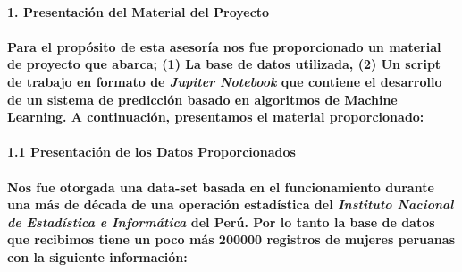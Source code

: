\documentclass[]{article}
\let\oldparagraph\paragraph
\renewcommand{\paragraph}[1]{\oldparagraph{#1}\mbox{}}
\begin{document}
\paragraph{\texorpdfstring{\textbf{1. Presentación del Material del
Proyecto}}{1. Presentación del Material del Proyecto}}\label{presentacion-del-material-del-proyecto}

\paragraph{\texorpdfstring{Para el propósito de esta asesoría nos fue
proporcionado un material de proyecto que abarca; (1) La base de datos
utilizada, (2) Un script de trabajo en formato de \emph{Jupiter
Notebook} que contiene el desarrollo de un sistema de predicción basado
en algoritmos de Machine Learning. A continuación, presentamos el
material
proporcionado:}{Para el propósito de esta asesoría nos fue proporcionado un material de proyecto que abarca; (1) La base de datos utilizada, (2) Un script de trabajo en formato de Jupiter Notebook que contiene el desarrollo de un sistema de predicción basado en algoritmos de Machine Learning. A continuación, presentamos el material proporcionado:}}\label{para-el-proposito-de-esta-asesoria-nos-fue-proporcionado-un-material-de-proyecto-que-abarca-1-la-base-de-datos-utilizada-2-un-script-de-trabajo-en-formato-de-jupiter-notebook-que-contiene-el-desarrollo-de-un-sistema-de-prediccion-basado-en-algoritmos-de-machine-learning.-a-continuacion-presentamos-el-material-proporcionado}

\paragraph{1.1 Presentación de los Datos
Proporcionados}\label{presentacion-de-los-datos-proporcionados}

\paragraph{\texorpdfstring{Nos fue otorgada una data-set basada en el
funcionamiento durante una más de década de una operación estadística
del \emph{Instituto Nacional de Estadística e Informática} del Perú. Por
lo tanto la base de datos que recibimos tiene un poco más 200000
registros de mujeres peruanas con la siguiente
información:}{Nos fue otorgada una data-set basada en el funcionamiento durante una más de década de una operación estadística del Instituto Nacional de Estadística e Informática del Perú. Por lo tanto la base de datos que recibimos tiene un poco más 200000 registros de mujeres peruanas con la siguiente información:}}\label{nos-fue-otorgada-una-data-set-basada-en-el-funcionamiento-durante-una-mas-de-decada-de-una-operacion-estadistica-del-instituto-nacional-de-estadistica-e-informatica-del-peru.-por-lo-tanto-la-base-de-datos-que-recibimos-tiene-un-poco-mas-200000-registros-de-mujeres-peruanas-con-la-siguiente-informacion}
\end{document}

